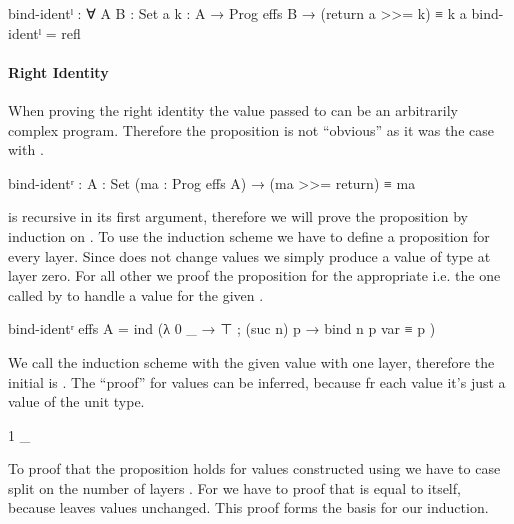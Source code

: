 \begin{code}
bind-identˡ : ∀ {A B : Set} {a} {k : A → Prog effs B} →
  (return a >>= k) ≡ k a
bind-identˡ = refl
\end{code}

\paragraph{Right Identity}
When proving the right identity the value passed to \AgdaFunction{>>=} can be an
arbitrarily complex program. Therefore the proposition is not ``obvious'' as it
was the case with .

\begin{AgdaAlign}
\begin{code}
bind-identʳ : {A : Set} (ma : Prog effs A) →
  (ma >>= return) ≡ ma
\end{code}
\AgdaFunction{>>=} is recursive in its first argument, therefore we will prove
the proposition by induction on .
To use the induction scheme we have to define a proposition for every layer.
Since \AgdaFunction{>>=} does not change values we simply produce a value of
type  at layer zero.
For all other we proof the proposition for the appropriate
 i.e. the one called by  to handle a value
for the given .

\begin{code}
bind-identʳ {effs} {A} = ind (λ{ 0 _ → ⊤ ; (suc n) p → bind n p var ≡ p })
\end{code}
We call the induction scheme with the given value with one layer, therefore the
initial  is .
The ``proof'' for values can be inferred, because fr each value it's just a
value of the unit type.

\begin{code}
  1 _
\end{code}
To proof that the proposition holds for values constructed using
 we have to case split on the number of layers
.
For  we have to proof that
\AgdaSpace{} is equal to itself,
because \AgdaFunction{>>=} leaves values unchanged.
This proof forms the basis for our induction.


\end{AgdaAlign}
